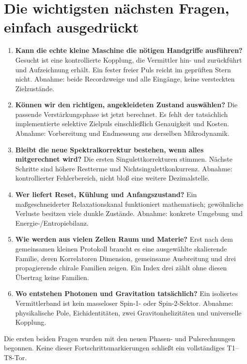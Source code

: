 \section{Die wichtigsten nächsten Fragen, einfach ausgedrückt}
\begin{enumerate}
\item \textbf{Kann die echte kleine Maschine die nötigen Handgriffe ausführen?}
Gesucht ist eine kontrollierte Kopplung, die Vermittler hin- und zurückführt und Aufzeichnung erhält. Ein fester freier Puls reicht im geprüften Stern nicht. Abnahme: beide Recordzweige und alle Eingänge, keine versteckten Zielzustände.
\item \textbf{Können wir den richtigen, angekleideten Zustand auswählen?}
Die passende Verstärkungsphase ist jetzt berechnet. Es fehlt der tatsächlich implementierte selektive Zielpuls einschließlich Genauigkeit und Kosten. Abnahme: Vorbereitung und Endmessung aus derselben Mikrodynamik.
\item \textbf{Bleibt die neue Spektralkorrektur bestehen, wenn alles mitgerechnet wird?}
Die ersten Singulettkorrekturen stimmen. Nächste Schritte sind höhere Restterme und Nichtsingulettkonkurrenz. Abnahme: kontrollierter Fehlerbereich, nicht bloß eine weitere Dezimalstelle.
\item \textbf{Wer liefert Reset, Kühlung und Anfangszustand?}
Ein maßgeschneiderter Relaxationskanal funktioniert mathematisch; gewöhnliche Verluste besitzen viele dunkle Zustände. Abnahme: konkrete Umgebung und Energie-/Entropiebilanz.
\item \textbf{Wie werden aus vielen Zellen Raum und Materie?}
Erst nach dem gemeinsamen kleinen Protokoll braucht es eine ausgewählte skalierende Familie, deren Korrelatoren Dimension, gemeinsame Ausbreitung und drei propagierende chirale Familien zeigen. Ein Index drei zählt ohne diesen Übertrag keine Familien.
\item \textbf{Wo entstehen Photonen und Gravitation tatsächlich?}
Ein isoliertes Vermittlerband ist kein masseloser Spin-1- oder Spin-2-Sektor. Abnahme: physikalische Pole, Eichidentitäten, zwei Gravitonhelizitäten und universelle Kopplung.
\end{enumerate}
Die ersten beiden Fragen wurden mit den neuen Phasen- und Pulsrechnungen begonnen. Keine dieser Fortschrittsmarkierungen schließt ein vollständiges T1--T8-Tor.
